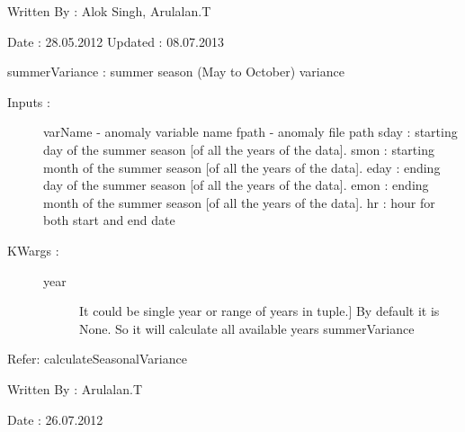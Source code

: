 \documentclass[letterpaper,10pt,english]{sphinxmanual}
\begin{document}

\begin{fulllineitems}
\label{mjo:variance_utils.plotVariance}
Written By : Alok Singh, Arulalan.T

Date : 28.05.2012
Updated : 08.07.2013

\end{fulllineitems}


\begin{fulllineitems}
\label{mjo:variance_utils.summerVariance}
summerVariance : summer season (May to October) variance
\begin{description}
\item[{Inputs :}] \leavevmode
varName - anomaly variable name
fpath - anomaly file path
sday : starting day of the summer season {[}of all the years of the data{]}.
smon : starting month of the summer season {[}of all the years of the data{]}.
eday : ending day of the summer season {[}of all the years of the data{]}.
emon : ending month of the summer season {[}of all the years of the data{]}.
hr : hour for both start and end date

\item[{KWargs :}] \leavevmode\begin{description}
\item[{year}] \leavevmode{[}It could be single year or range of years in tuple.{]}
By default it is None. So it will calculate all available years
summerVariance

\end{description}

\end{description}

Refer: calculateSeasonalVariance

Written By : Arulalan.T

Date : 26.07.2012

\end{fulllineitems}

\end{document}
